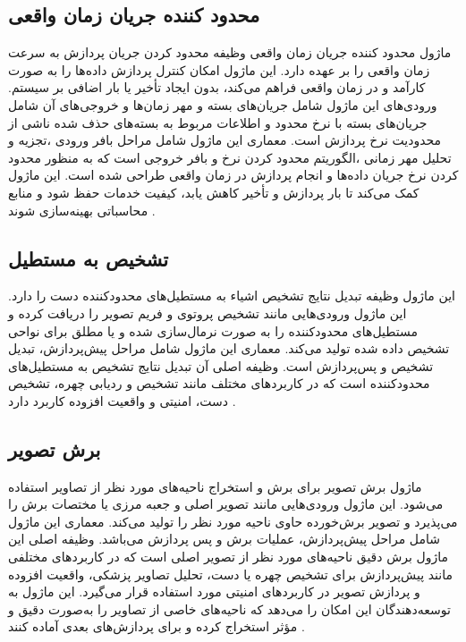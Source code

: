 \subsection{محدود کننده جریان زمان واقعی\protect{}}
ماژول محدود کننده جریان زمان واقعی وظیفه محدود کردن جریان پردازش به سرعت زمان واقعی را بر عهده دارد. این ماژول امکان کنترل پردازش داده‌ها را به صورت کارآمد و در زمان واقعی فراهم می‌کند، بدون ایجاد تأخیر یا بار اضافی 
بر سیستم. ورودی‌های این ماژول شامل جریان‌های بسته و مهر زمان‌ها  و خروجی‌های آن شامل جریان‌های بسته با نرخ محدود و اطلاعات مربوط به 
بسته‌های حذف شده ناشی از محدودیت نرخ پردازش است. معماری این ماژول شامل مراحل بافر ورودی ،تجزیه و تحلیل مهر زمانی ،الگوریتم محدود کردن نرخ  و
بافر خروجی است که به منظور محدود کردن نرخ جریان داده‌ها و انجام پردازش در زمان واقعی طراحی شده است. این ماژول کمک می‌کند تا بار پردازش و تأخیر کاهش یابد، کیفیت خدمات حفظ شود و منابع محاسباتی بهینه‌سازی شوند \cite{zhang2020mediapipe}.


\subsection{تشخیص به مستطیل\protect{}}
این ماژول وظیفه تبدیل نتایج تشخیص اشیاء به مستطیل‌های محدودکننده دست را دارد. این ماژول ورودی‌هایی مانند تشخیص پروتوی و فریم تصویر را دریافت کرده و مستطیل‌های محدودکننده را به صورت 
نرمال‌سازی شده و یا مطلق برای نواحی تشخیص داده شده تولید می‌کند. معماری این ماژول شامل مراحل  پیش‌پردازش، تبدیل تشخیص و پس‌پردازش است. وظیفه اصلی آن تبدیل نتایج تشخیص به 
مستطیل‌های محدودکننده است که در کاربردهای مختلف مانند تشخیص و ردیابی چهره، تشخیص دست، امنیتی و واقعیت افزوده کاربرد دارد \cite{zhang2020mediapipe}.


\subsection{برش تصویر \protect{}}
ماژول برش تصویر برای برش و استخراج ناحیه‌های مورد نظر از تصاویر استفاده می‌شود. این ماژول ورودی‌هایی مانند تصویر اصلی و جعبه مرزی یا مختصات برش را می‌پذیرد و تصویر برش‌خورده حاوی ناحیه مورد 
نظر را تولید می‌کند. معماری این ماژول شامل مراحل پیش‌پردازش، عملیات برش  و پس‌ پردازش  می‌باشد. وظیفه اصلی این ماژول برش دقیق ناحیه‌های مورد نظر از تصویر اصلی است که در کاربردهای 
مختلفی مانند پیش‌پردازش برای تشخیص چهره یا دست، تحلیل تصاویر پزشکی، واقعیت افزوده و پردازش تصویر در کاربردهای امنیتی مورد استفاده قرار می‌گیرد. این ماژول به 
توسعه‌دهندگان این امکان را می‌دهد که ناحیه‌های خاصی از تصاویر را به‌صورت دقیق و مؤثر استخراج کرده و برای پردازش‌های بعدی آماده کنند \cite{zhang2020mediapipe}.



